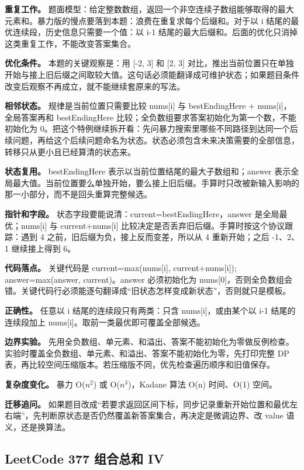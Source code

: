 \textbf{重复工作。} 题面模型：给定整数数组，返回一个非空连续子数组能够取得的最大元素和。暴力版的慢点要落到本题：浪费在重复求每个后缀和。对于以 i 结尾的最优连续段，历史信息只需要一个值：以 i-1 结尾的最大后缀和。后面的优化只消掉这类重复工作，不能改变答案集合。

\textbf{优化条件。} 本题的关键观察是：用 [-2, 3] 和 [2, 3] 对比，推出当前位置只在单独开始与接上旧后缀之间取较大值。这句话必须能翻译成可维护状态；如果题目条件改变后观察不再成立，就不能继续套原来的写法。

\textbf{相邻状态。} 规律是当前位置只需要比较 nums[i] 与 bestEndingHere + nums[i]，全局答案再和 bestEndingHere 比较；全负数组要求答案初始化为第一个数，不能初始化为 0。把这个特例继续拆开看：先问暴力搜索里哪些不同路径到达同一个后续问题，再给这个后续问题命名为状态。状态必须包含未来决策需要的全部信息，转移只从更小且已经算清的状态来。

\textbf{状态复用。} bestEndingHere 表示以当前位置结尾的最大子数组和；answer 表示全局最大值。当前位置要么单独开始，要么接上旧后缀。手算时只改被新输入影响的那一小部分，而不是回头重算完整候选。

\textbf{指针和字段。} 状态字段要能说清：current=bestEndingHere，answer 是全局最优；nums[i] 与 current+nums[i] 比较决定是否丢弃旧后缀。手算时按这个协议跟踪：遇到 4 之前，旧后缀为负，接上反而变差，所以从 4 重新开始；之后 -1、2、1 继续接上得到 6。

\textbf{代码落点。} 关键代码是 current=max(nums[i], current+nums[i]); answer=max(answer, current)。answer 必须初始化为 nums[0]，否则全负数组会错。关键代码行必须能逐句翻译成“旧状态怎样变成新状态”，否则就只是模板。

\textbf{正确性。} 任意以 i 结尾的连续段只有两类：只含 nums[i]，或由某个以 i-1 结尾的连续段加上 nums[i]。取前一类最优即可覆盖全部候选。

\textbf{边界实验。} 先用全负数组、单元素、和溢出、答案不能初始化为零做反例检查。实验时覆盖全负数组、单元素、和溢出、答案不能初始化为零，先打印完整 DP 表，再比较空间压缩版本。若压缩版不同，优先检查遍历顺序和旧值保存。

\textbf{复杂度变化。} 暴力 O(\ensuremath{n^{2}}) 或 O(\ensuremath{n^{3}})，Kadane 算法 O(n) 时间、O(1) 空间。

\textbf{迁移追问。} 如果题目改成“若要求返回区间下标，同步记录重新开始位置和最优左右端”，先判断原状态是否仍然覆盖新答案集合，再决定是微调边界、改 value 语义，还是换算法。

\subsection{LeetCode 377 组合总和 IV}

